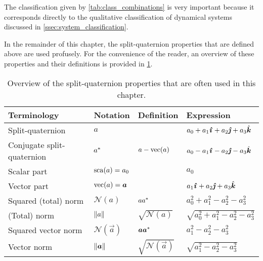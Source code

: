 The classification given by \cref{tab:class_combinations} is very important because it corresponds directly to the qualitative classification of dynamical systems discussed in \cref{ssec:system_classification}.

In the remainder of this chapter, the split-quaternion properties that are defined above are used profusely. For the convenience of the reader, an overview of these properties and their definitions is provided in \cref{tab:spquat_properties}. 

\renewcommand{\arraystretch}{1.3}
\begin{table}[ht!]
    \centering
    \caption{Overview of the split-quaternion properties that are often used in this chapter.}
    \label{tab:spquat_properties}
    \begin{tabular}{llll}
        \toprule
        \textbf{Terminology} & \textbf{Notation} & \textbf{Definition} & \textbf{Expression} \\
        \midrule
        Split-quaternion & \(a\) & &  \(a_0 + a_1\quati + a_2\quatj + a_3\quatk\) \\
        Conjugate split-quaternion &  \(a^*\) & $ a - \mathrm{vec}\qty(a) $ & \(a_0 - a_1\quati - a_2\quatj - a_3\quatk\)\\
        \midrule
        Scalar part & \(\mathrm{sca}\qty(a) = a_0\) & & \(a_0\) \\
        Vector part & \(\vecpart{a} = \vec{a}\) & & \(a_1\quati + a_2\quatj + a_3\quatk\) \\
        \midrule
        Squared (total) norm & \(\mathscr{N}(a)\) & \(aa^*\) &  
        \(a_0^2 + a_1^2 - a_2^2 - a_3^2\) \\
        (Total) norm & \(\norm{a}\) & \(\sqrt{\mathscr{N}(a)}\) & \(\sqrt{a_0^2 + a_1^2 - a_2^2 - a_3^2}\) \\
        \midrule
        Squared vector norm & \(\mathscr{N}(\vec{a})\) & \( \vec{a}\conj{\vec{a}} \) & \( a_1^2 - a_2^2 - a_3^2 \) \\
        Vector norm & \(\norm{\vec{a}}\) & \(\sqrt{\mathscr{N}(\vec{a})}\) & \(\sqrt{a_1^2 - a_2^2 - a_3^2}\) \\
        \bottomrule
    \end{tabular}
\end{table}
\renewcommand{\arraystretch}{1}
 
